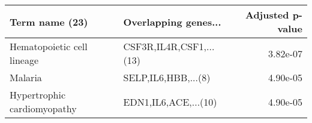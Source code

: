 \begin{tabular}{llr}
\toprule
             Term name (23) &    Overlapping genes... &  Adjusted p-value \\
\midrule
 Hematopoietic cell lineage & CSF3R,IL4R,CSF1,...(13) &          3.82e-07 \\
                    Malaria &     SELP,IL6,HBB,...(8) &          4.90e-05 \\
Hypertrophic cardiomyopathy &    EDN1,IL6,ACE,...(10) &          4.90e-05 \\
\bottomrule
\end{tabular}
